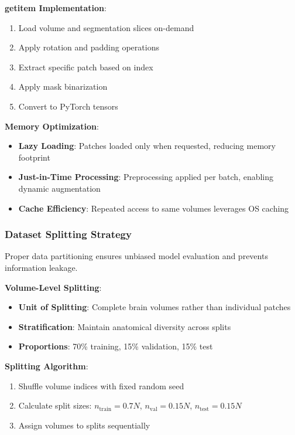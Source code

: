 \documentclass[12pt,a4paper]{article}
\begin{document}
\textbf{getitem Implementation}:
\begin{enumerate}
    \item Load volume and segmentation slices on-demand
    \item Apply rotation and padding operations
    \item Extract specific patch based on index
    \item Apply mask binarization
    \item Convert to PyTorch tensors
\end{enumerate}

\textbf{Memory Optimization}:
\begin{itemize}
    \item \textbf{Lazy Loading}: Patches loaded only when requested, reducing memory footprint
    \item \textbf{Just-in-Time Processing}: Preprocessing applied per batch, enabling dynamic augmentation
    \item \textbf{Cache Efficiency}: Repeated access to same volumes leverages OS caching
\end{itemize}

\subsubsection{Dataset Splitting Strategy}

Proper data partitioning ensures unbiased model evaluation and prevents information leakage.

\textbf{Volume-Level Splitting}:
\begin{itemize}
    \item \textbf{Unit of Splitting}: Complete brain volumes rather than individual patches
    \item \textbf{Stratification}: Maintain anatomical diversity across splits
    \item \textbf{Proportions}: 70\% training, 15\% validation, 15\% test
\end{itemize}

\textbf{Splitting Algorithm}:
\begin{enumerate}
    \item Shuffle volume indices with fixed random seed
    \item Calculate split sizes: $n_{\text{train}} = 0.7N$, $n_{\text{val}} = 0.15N$, $n_{\text{test}} = 0.15N$
    \item Assign volumes to splits sequentially
\end{enumerate}
\end{document}
